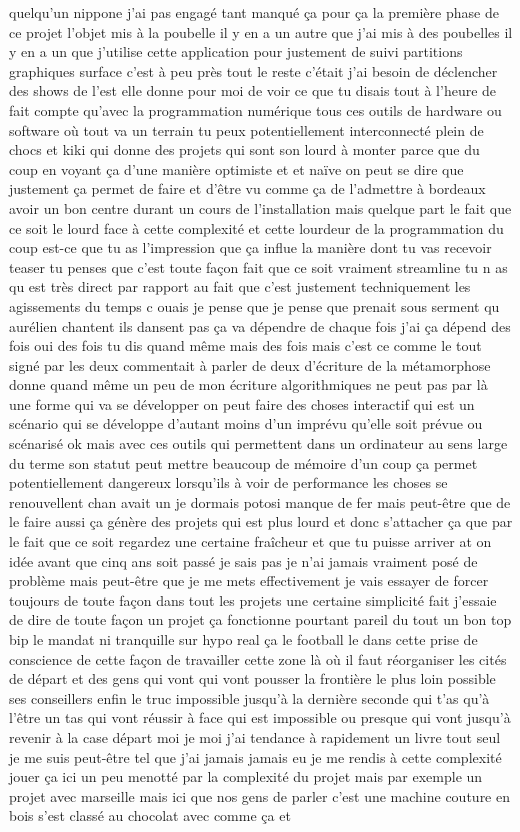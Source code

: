 quelqu'un nippone j'ai pas engagé tant manqué ça pour ça la première phase de ce projet l'objet mis à la poubelle il y en a un autre que j'ai mis à des poubelles il y en a un que j'utilise cette application pour justement de suivi partitions graphiques surface c'est à peu près tout le reste c'était j'ai besoin de déclencher des shows de l'est elle donne pour moi de voir ce que tu disais tout à l'heure de fait compte qu'avec la programmation numérique tous ces outils de hardware ou software où tout va un terrain tu peux potentiellement interconnecté plein de chocs et kiki qui donne des projets qui sont son lourd à monter parce que du coup en voyant ça d'une manière optimiste et et naïve on peut se dire que justement ça permet de faire et d'être vu comme ça de l'admettre à bordeaux avoir un bon centre durant un cours de l'installation mais quelque part le fait que ce soit le lourd face à cette complexité et cette lourdeur de la programmation du coup est-ce que tu as l'impression que ça influe la manière dont tu vas recevoir teaser tu penses que c'est toute façon fait que ce soit vraiment streamline tu n as qu est très direct par rapport au fait que c'est justement techniquement les agissements du temps c ouais je pense que je pense que prenait sous serment qu aurélien chantent ils dansent pas ça va dépendre de chaque fois j'ai ça dépend des fois oui des fois tu dis quand même mais des fois mais c'est ce comme le tout signé par les deux commentait à parler de deux d'écriture de la métamorphose donne quand même un peu de mon écriture algorithmiques ne peut pas par là une forme qui va se développer on peut faire des choses interactif qui est un scénario qui se développe d'autant moins d'un imprévu qu'elle soit prévue ou scénarisé ok mais avec ces outils qui permettent dans un ordinateur au sens large du terme son statut peut mettre beaucoup de mémoire d'un coup ça permet potentiellement dangereux lorsqu'ils à voir de performance les choses se renouvellent chan avait un je dormais potosi manque de fer mais peut-être que de le faire aussi ça génère des projets qui est plus lourd et donc s'attacher ça que par le fait que ce soit regardez une certaine fraîcheur et que tu puisse arriver at on idée avant que cinq ans soit passé je sais pas je n'ai jamais vraiment posé de problème mais peut-être que je me mets effectivement je vais essayer de forcer toujours de toute façon dans tout les projets une certaine simplicité fait j'essaie de dire de toute façon un projet ça fonctionne pourtant pareil du tout un bon top bip le mandat ni tranquille sur hypo real ça le football le dans cette prise de conscience de cette façon de travailler cette zone là où il faut réorganiser les cités de départ et des gens qui vont qui vont pousser la frontière le plus loin possible ses conseillers enfin le truc impossible jusqu'à la dernière seconde qui t'as qu'à l'être un tas qui vont réussir à face qui est impossible ou presque qui vont jusqu'à revenir à la case départ moi je moi j'ai tendance à rapidement un livre tout seul je me suis peut-être tel que j'ai jamais jamais eu je me rendis à cette complexité jouer ça ici un peu menotté par la complexité du projet mais par exemple un projet avec marseille mais ici que nos gens de parler c'est une machine couture en bois s'est classé au chocolat avec comme ça et 